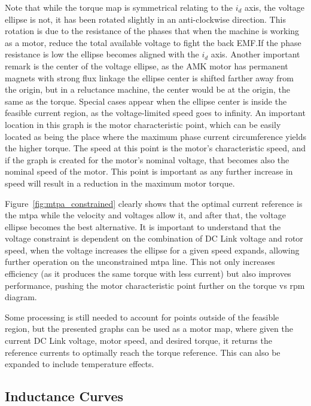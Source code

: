 Note that while the torque map is symmetrical relating to the $i_d$ axis, the voltage ellipse is not, it has been rotated slightly in an anti-clockwise direction. This rotation is due to the resistance of the phases that when the machine is working as a motor, reduce the total available voltage to fight the back EMF.\@ If the phase resistance is low the ellipse becomes aligned with the $i_d$ axis. Another important remark is the center of the voltage ellipse, as the AMK motor has permanent magnets with strong flux linkage the ellipse center is shifted farther away from the origin, but in a reluctance machine, the center would be at the origin, the same as the torque. Special cases appear when the ellipse center is inside the feasible current region, as the voltage-limited speed goes to infinity. An important location in this graph is the motor characteristic point, which can be easily located as being the place where the maximum phase current circumference yields the higher torque. The speed at this point is the motor's characteristic speed, and if the graph is created for the motor's nominal voltage, that becomes also the nominal speed of the motor. This point is important as any further increase in speed will result in a reduction in the maximum motor torque.

Figure~\ref{fig:mtpa_constrained} clearly shows that the optimal current reference is the \gls{mtpa} while the velocity and voltages allow it, and after that, the voltage ellipse becomes the best alternative. It is important to understand that the voltage constraint is dependent on the combination of DC Link voltage and rotor speed, when the voltage increases the ellipse for a given speed expands, allowing further operation on the unconstrained \gls{mtpa} line. This not only increases efficiency (as it produces the same torque with less current) but also improves performance, pushing the motor characteristic point further on the torque vs rpm diagram. 

Some processing is still needed to account for points outside of the feasible region, but the presented graphs can be used as a motor map,  where given the current DC Link voltage, motor speed, and desired torque, it returns the reference currents to optimally reach the torque reference. This can also be expanded to include temperature effects. 

\subsection{Inductance Curves}
\label{section:inductance_curves_current_reference}

